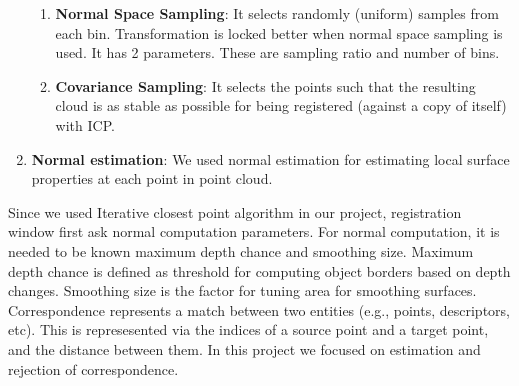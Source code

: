\documentclass[aps,letterpaper,11pt]{revtex4}
\begin{document}
\begin{enumerate}
\begin{enumerate}
 \item \textbf{Normal Space Sampling}: It selects randomly (uniform)  samples from each bin.  Transformation is locked better when normal space sampling is used. It has 2 parameters. These are sampling ratio and number of bins. 
 \item \textbf{Covariance Sampling}: It selects the points such that the resulting cloud is as stable as possible for being registered (against a copy of itself) with ICP.
\end{enumerate}
 \item \textbf{Normal estimation}: We used normal estimation for estimating  local surface properties at each point in point cloud.
\end{enumerate}

Since we used Iterative closest point algorithm in our project, registration window first ask normal computation parameters. For normal computation, it is needed to be known maximum depth chance and smoothing size. Maximum depth chance is defined as  threshold for computing object borders based on depth changes. Smoothing size is the factor for tuning area for smoothing surfaces.  Correspondence represents a match between two entities (e.g., points, descriptors, etc). This is represesented via the indices of a source point and a target point, and the distance between them. In this project we focused on estimation and rejection of correspondence.
\end{document}
